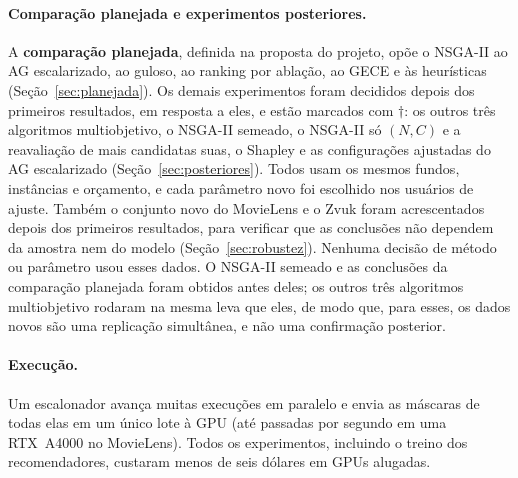\paragraph{Comparação planejada e experimentos posteriores.}
\label{sec:posthoc}
A \textbf{comparação planejada}, definida na proposta do projeto, opõe o
NSGA-II ao AG escalarizado, ao guloso, ao ranking por ablação, ao GECE e às
heurísticas (Seção~\ref{sec:planejada}). Os demais experimentos foram
decididos depois dos primeiros resultados, em resposta a eles, e estão
marcados com $\dagger$: os outros três algoritmos
multiobjetivo, o NSGA-II semeado, o NSGA-II só $(N,C)$ e a reavaliação de mais
candidatas suas, o Shapley e as configurações ajustadas do AG escalarizado
(Seção~\ref{sec:posteriores}).
Todos usam os mesmos fundos, instâncias e orçamento, e cada parâmetro novo foi
escolhido nos usuários de ajuste. Também o conjunto novo do MovieLens e o Zvuk
foram acrescentados depois dos primeiros resultados, para verificar que as
conclusões não dependem da amostra nem do modelo (Seção~\ref{sec:robustez}).
Nenhuma decisão de método ou parâmetro usou esses dados. O NSGA-II semeado e as
conclusões da comparação planejada foram obtidos antes deles; os outros três
algoritmos multiobjetivo rodaram na mesma leva que eles, de modo que, para
esses, os dados novos são uma replicação simultânea, e não uma confirmação
posterior.

\paragraph{Execução.}
Um escalonador avança muitas execuções em paralelo e envia as máscaras de
todas elas em um único lote à GPU (até  passadas por
segundo em uma RTX~A4000 no MovieLens). Todos os experimentos, incluindo o
treino dos recomendadores, custaram menos de seis dólares em GPUs alugadas.
